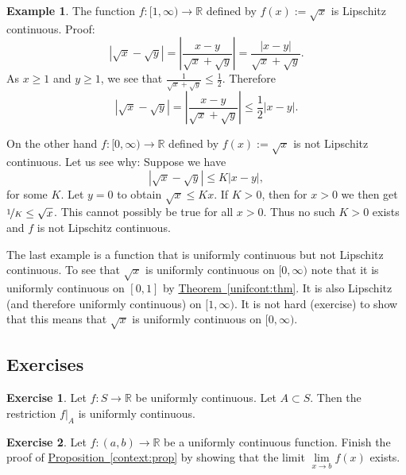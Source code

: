 \documentclass[12pt]{book}
\newcommand{\abs}[1]{\left\lvert {#1} \right\rvert}
\newcommand{\R}{{\mathbb{R}}}
\theoremstyle{plain}
\theoremstyle{remark}
\theoremstyle{definition}
\theoremstyle{exercise}
\newtheorem{exercise}{Exercise}[section]
\theoremstyle{example}
\newtheorem{example}[thm]{Example}
\newcommand{\thmref}[1]{\hyperref[#1]{Theorem~\ref*{#1}}}
\newcommand{\propref}[1]{\hyperref[#1]{Proposition~\ref*{#1}}}
\begin{document}
\begin{example}
The function $f \colon [1,\infty) \to \R$ defined by $f(x) := \sqrt{x}$
is Lipschitz continuous. Proof:
\begin{equation*}
\abs{\sqrt{x}-\sqrt{y}} = 
\abs{\frac{x-y}{\sqrt{x}+\sqrt{y}}}
=
\frac{\abs{x-y}}{\sqrt{x}+\sqrt{y}} .
\end{equation*}
As $x \geq 1$ and $y \geq 1$, we see that $\frac{1}{\sqrt{x}+\sqrt{y}}
\leq \frac{1}{2}$.  Therefore
\begin{equation*}
\abs{\sqrt{x}-\sqrt{y}} = 
\abs{\frac{x-y}{\sqrt{x}+\sqrt{y}}}
\leq
\frac{1}{2}
\abs{x-y}.
\end{equation*}

On the other hand $f \colon [0,\infty) \to \R$ defined by
$f(x) := \sqrt{x}$ is not Lipschitz continuous.  Let us see why:
Suppose we have
\begin{equation*}
\abs{\sqrt{x}-\sqrt{y}} 
\leq
K \abs{x-y} ,
\end{equation*}
for some $K$.  Let $y=0$ to obtain
$\sqrt{x} \leq K x$.   If $K > 0$, then for $x > 0$ we then get
$\nicefrac{1}{K} \leq \sqrt{x}$.  This cannot possibly be true for all
$x > 0$.  Thus no such $K > 0$ exists and $f$ is not
Lipschitz continuous.

The last example is a function that is uniformly
continuous but not Lipschitz continuous.  To see that $\sqrt{x}$
is
uniformly continuous on $[0,\infty)$ note that it is uniformly continuous on
$[0,1]$ by \thmref{unifcont:thm}.  It is also Lipschitz (and
therefore uniformly continuous) on $[1,\infty)$.  It is not hard (exercise)
to show that this means that $\sqrt{x}$ is uniformly continuous on
$[0,\infty)$.
\end{example}

\subsection{Exercises}

\begin{exercise}
Let $f \colon S \to \R$ be uniformly continuous.  Let $A \subset S$.
Then the restriction $f|_A$ is uniformly continuous.
\end{exercise}

\begin{exercise}
Let $f \colon (a,b) \to \R$ be a uniformly continuous function.
Finish the proof of \propref{context:prop} by showing that
the limit
$\lim\limits_{x \to b} f(x)$
exists.
\end{exercise}
\end{document}

